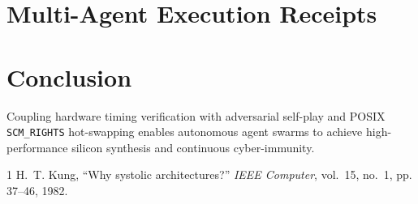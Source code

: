 \documentclass[10pt,journal,compsoc]{IEEEtran}
\begin{document}
\section{Multi-Agent Execution Receipts}

\begin{table}[h]
\centering
\caption{Empirical Multi-Agent Execution Receipts (Case 3)}
\label{tab:receipts3}
\end{table}

\section{Conclusion}
Coupling hardware timing verification with adversarial self-play and POSIX \texttt{SCM\_RIGHTS} hot-swapping enables autonomous agent swarms to achieve high-performance silicon synthesis and continuous cyber-immunity.

\begin{thebibliography}{1}
H.~T. Kung, ``Why systolic architectures?'' \emph{IEEE Computer}, vol.~15, no.~1, pp. 37--46, 1982.
\end{thebibliography}
\end{document}
